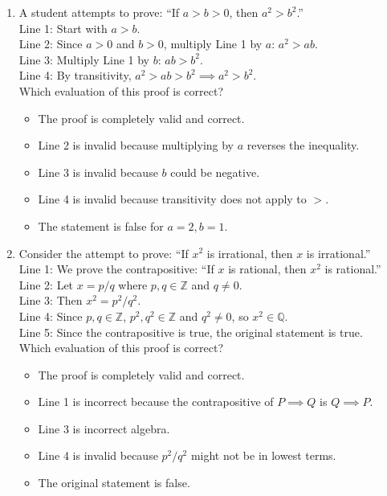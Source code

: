 \documentclass[11pt,a4paper]{article}
\begin{document}
\begin{enumerate}
\item A student attempts to prove: ``If $a > b > 0$, then $a^2 > b^2$.''\\
Line 1: Start with $a > b$.\\
Line 2: Since $a > 0$ and $b > 0$, multiply Line 1 by $a$: $a^2 > ab$.\\
Line 3: Multiply Line 1 by $b$: $ab > b^2$.\\
Line 4: By transitivity, $a^2 > ab > b^2 \implies a^2 > b^2$.\\
Which evaluation of this proof is correct?
\begin{itemize}
\item[A)] The proof is completely valid and correct.
\item[B)] Line 2 is invalid because multiplying by $a$ reverses the inequality.
\item[C)] Line 3 is invalid because $b$ could be negative.
\item[D)] Line 4 is invalid because transitivity does not apply to $>$.
\item[E)] The statement is false for $a=2, b=1$.
\end{itemize}

\item Consider the attempt to prove: ``If $x^2$ is irrational, then $x$ is irrational.''\\
Line 1: We prove the contrapositive: ``If $x$ is rational, then $x^2$ is rational.''\\
Line 2: Let $x = p/q$ where $p,q \in \mathbb{Z}$ and $q \neq 0$.\\
Line 3: Then $x^2 = p^2/q^2$.\\
Line 4: Since $p,q \in \mathbb{Z}$, $p^2, q^2 \in \mathbb{Z}$ and $q^2 \neq 0$, so $x^2 \in \mathbb{Q}$.\\
Line 5: Since the contrapositive is true, the original statement is true.\\
Which evaluation of this proof is correct?
\begin{itemize}
\item[A)] The proof is completely valid and correct.
\item[B)] Line 1 is incorrect because the contrapositive of $P \implies Q$ is $Q \implies P$.
\item[C)] Line 3 is incorrect algebra.
\item[D)] Line 4 is invalid because $p^2/q^2$ might not be in lowest terms.
\item[E)] The original statement is false.
\end{itemize}


\end{enumerate}
\end{document}
